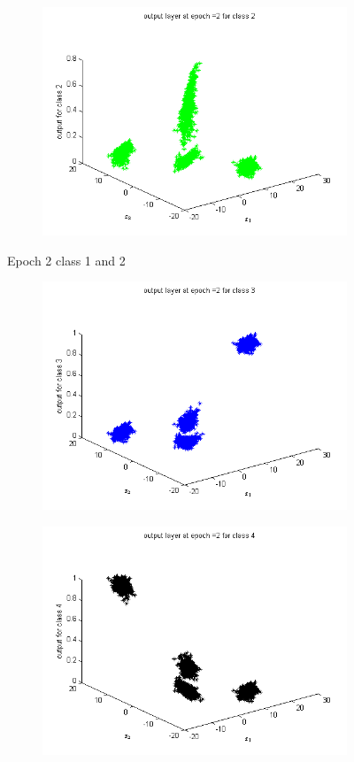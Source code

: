\documentclass{article}
\begin{document}
\begin{flushleft}
\begin{figure}
\begin{subfigure}{.5\textwidth}
\end{subfigure}%
\begin{subfigure}{.5\textwidth}
  \centering
  \includegraphics[width=.8\linewidth]{Classification/linearlySeparable/2_2}
  
\end{subfigure}
\caption{Epoch 2 class 1 and 2}
\end{figure}

\begin{figure}
\begin{subfigure}{.5\textwidth}
  \centering
  \includegraphics[width=.8\linewidth]{Classification/linearlySeparable/2_3}
 
\end{subfigure}%
\begin{subfigure}{.5\textwidth}
  \centering
  \includegraphics[width=.8\linewidth]{Classification/linearlySeparable/2_4}
  

\end{subfigure}
\end{figure}
\end{flushleft}
\end{document}
